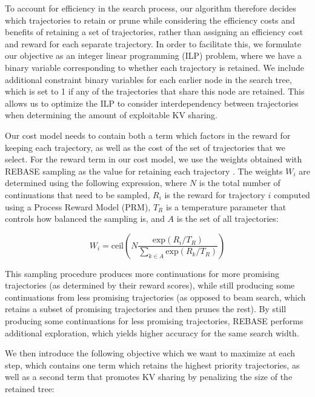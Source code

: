 To account for efficiency in the search process, our algorithm therefore decides which trajectories to retain or prune while considering the efficiency costs and benefits of retaining a set of trajectories, rather than assigning an efficiency cost and reward for each separate trajectory.
In order to facilitate this, we formulate our objective as an integer linear programming (ILP) problem, where we have a binary variable corresponding to whether each trajectory is retained.
We include additional constraint binary variables for each earlier node in the search tree, which is set to 1 if any of the trajectories that share this node are retained.
This allows us to optimize the ILP to consider interdependency between trajectories when determining the amount of exploitable KV sharing.

Our cost model needs to contain both a term which factors in the reward for keeping each trajectory, as well as the cost of the set of trajectories that we select.
For the reward term in our cost model, we use the weights obtained with REBASE sampling as the value for retaining each trajectory \cite{wu2024inference}.
The weights $W_i$ are determined using the following expression, where $N$ is the total number of continuations that need to be sampled, $R_i$ is the reward for trajectory $i$ computed using a Process Reward Model (PRM), $T_R$ is a temperature parameter that controls how balanced the sampling is, and $A$ is the set of all trajectories:

\begin{equation}
    \label{eq:rebase}
    W_i = \mathrm{ceil} ( N \frac{\mathrm{exp}(R_i / T_R)}{\sum_{k \in A}\mathrm{exp}(R_k / T_R)}  )
\end{equation}

This sampling procedure produces more continuations for more promising trajectories (as determined by their reward scores), while still producing some continuations from less promising trajectories (as opposed to beam search, which retains a subset of promising trajectories and then prunes the rest).
By still producing some continuations for less promising trajectories, REBASE performs additional exploration, which yields higher accuracy for the same search width.

We then introduce the following objective which we want to maximize at each step, which contains one term which retains the highest priority trajectories, as well as a second term that promotes KV sharing by penalizing the size of the retained tree:

